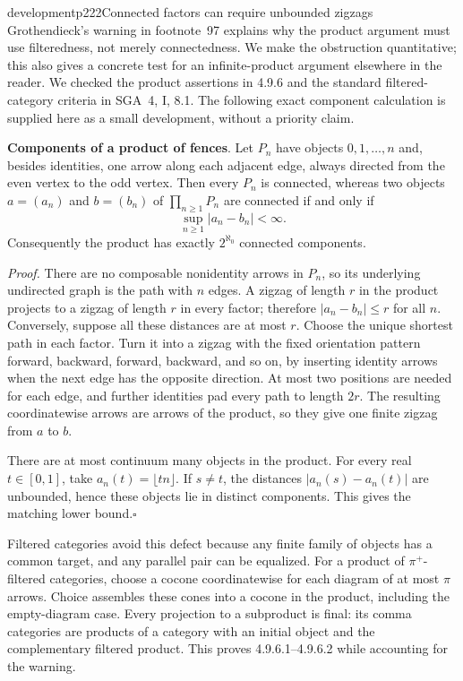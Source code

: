 \begin{dcomment}{development}{p222}{Connected factors can require unbounded zigzags}
Grothendieck's warning in footnote~97 explains why the product argument must use filteredness, not merely connectedness. We make the obstruction quantitative; this also gives a concrete test for an infinite-product argument elsewhere in the reader. We checked the product assertions in 4.9.6 and the standard filtered-category criteria in SGA~4, I, 8.1. The following exact component calculation is supplied here as a small development, without a priority claim.

\textbf{Components of a product of fences}\ours.
Let $P_n$ have objects $0,1,\ldots,n$ and, besides identities, one arrow along each adjacent edge, always directed from the even vertex to the odd vertex. Then every $P_n$ is connected, whereas two objects $a=(a_n)$ and $b=(b_n)$ of $\prod_{n\geq1}P_n$ are connected if and only if
\[
 \sup_{n\geq1}|a_n-b_n|<\infty.
\]
Consequently the product has exactly $2^{\aleph_0}$ connected components.

\textit{Proof.} There are no composable nonidentity arrows in $P_n$, so its underlying undirected graph is the path with $n$ edges. A zigzag of length $r$ in the product projects to a zigzag of length $r$ in every factor; therefore $|a_n-b_n|\leq r$ for all $n$. Conversely, suppose all these distances are at most $r$. Choose the unique shortest path in each factor. Turn it into a zigzag with the fixed orientation pattern forward, backward, forward, backward, and so on, by inserting identity arrows when the next edge has the opposite direction. At most two positions are needed for each edge, and further identities pad every path to length $2r$. The resulting coordinatewise arrows are arrows of the product, so they give one finite zigzag from $a$ to $b$.

There are at most continuum many objects in the product. For every real $t\in[0,1]$, take $a_n(t)=\lfloor tn\rfloor$. If $s\neq t$, the distances $|a_n(s)-a_n(t)|$ are unbounded, hence these objects lie in distinct components. This gives the matching lower bound.\hfill$\square$

Filtered categories avoid this defect because any finite family of objects has a common target, and any parallel pair can be equalized. For a product of $\pi^+$-filtered categories, choose a cocone coordinatewise for each diagram of at most $\pi$ arrows. Choice assembles these cones into a cocone in the product, including the empty-diagram case. Every projection to a subproduct is final: its comma categories are products of a category with an initial object and the complementary filtered product. This proves 4.9.6.1--4.9.6.2 while accounting for the warning.
\end{dcomment}

